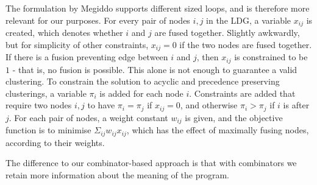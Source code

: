The formulation by Megiddo\cite{megiddo1997optimal} supports different sized loops, and is therefore more relevant for our purposes.
For every pair of nodes $i,j$ in the LDG, a variable $x_{ij}$ is created, which denotes whether $i$ and $j$ are fused together.
Slightly awkwardly, but for simplicity of other constraints, $x_{ij} = 0$ if the two nodes are fused together.
If there is a fusion preventing edge between $i$ and $j$, then $x_{ij}$ is constrained to be $1$ - that is, no fusion is possible.
This alone is not enough to guarantee a valid clustering.
To constrain the solution to acyclic and precedence preserving clusterings, a variable $\pi_i$ is added for each node $i$.
Constraints are added that require two nodes $i,j$ to have $\pi_i = \pi_j$ if $x_{ij} = 0$, and otherwise $\pi_i > \pi_j$ if $i$ is after $j$.
For each pair of nodes, a weight constant $w_{ij}$ is given, and the objective function is to minimise $\Sigma_{ij} w_{ij} x_{ij}$, which has the effect of maximally fusing nodes, according to their weights.

The difference to our combinator-based approach is that with combinators we retain more information about the meaning of the program.


